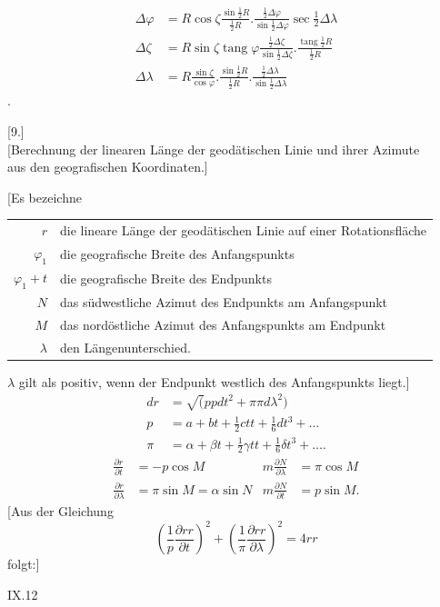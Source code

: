 \clearpage
\noindent\makebox[12mm][l]{}\par\medskip
\[
\begin{aligned}
\Delta\varphi&=R\cos\zeta\frac{\sin\tfrac12R}{\tfrac12R}.
\frac{\tfrac12\Delta\varphi}{\sin\tfrac12\Delta\varphi}\sec\tfrac12\Delta\lambda\\[1ex]
\Delta\zeta&=R\sin\zeta\operatorname{tang}\varphi\frac{\tfrac12\Delta\zeta}{\sin\tfrac12\Delta\zeta}.
\frac{\operatorname{tang}\tfrac12R}{\tfrac12R}\\[1ex]
\Delta\lambda&=R\frac{\sin\zeta}{\cos\varphi}.\frac{\sin\tfrac12R}{\tfrac12R}.
\frac{\tfrac12\Delta\lambda}{\sin\tfrac12\Delta\lambda}
\end{aligned}
\]
.
\begin{center}[9.]\\[1ex]
[Berechnung der linearen Länge der geodätischen Linie und ihrer Azimute\\
aus den geografischen Koordinaten.]
\end{center}
[Es bezeichne
\begin{center}
\begin{tabular}{r@{\quad}p{.87\linewidth}}
\(r\)&die lineare Länge der geodätischen Linie auf einer Rotationsfläche\\
\(\varphi_1\)&die geografische Breite des Anfangspunkts\\
\(\varphi_1+t\)&die geografische Breite des Endpunkts\\
\(N\)&das südwestliche Azimut des Endpunkts am Anfangspunkt\\
\(M\)&das nordöstliche Azimut des Anfangspunkts am Endpunkt\\
\(\lambda\)&den Längenunterschied.
\end{tabular}
\end{center}
\noindent\(\lambda\) gilt als positiv, wenn der Endpunkt westlich des Anfangspunkts liegt.]
\[
\begin{aligned}
dr&=\surd(ppdt^2+\pi\pi d\lambda^2)\\
p&=a+bt+\tfrac12ctt+\tfrac16dt^3+\ldots\\
\pi&=\alpha+\beta t+\tfrac12\gamma tt+\tfrac16\delta t^3+\ldots.
\end{aligned}
\]
\[
\begin{aligned}
\frac{\partial r}{\partial t}&=-p\cos M&
m\frac{\partial N}{\partial\lambda}&=\pi\cos M\\
\frac{\partial r}{\partial\lambda}&=\pi\sin M=\alpha\sin N&
m\frac{\partial N}{\partial t}&=p\sin M.
\end{aligned}
\]
[Aus der Gleichung
\[
\left(\frac1p\frac{\partial rr}{\partial t}\right)^2+
\left(\frac1\pi\frac{\partial rr}{\partial\lambda}\right)^2=4rr
\]
\noindent folgt:]
\par\vfill\noindent IX.\hfill12

